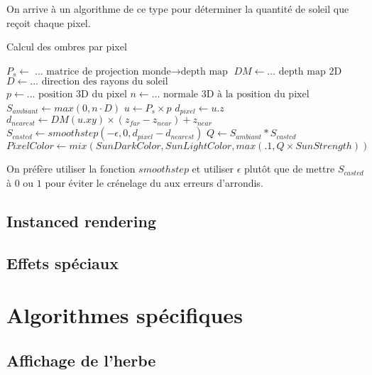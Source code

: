 \documentclass[11pt]{article} %
\begin{document}
On arrive à un algorithme de ce type pour déterminer la quantité de soleil que reçoit chaque pixel.
\begin{algorithm}
\caption{Calcul des ombres par pixel}\label{alg:cap}
\begin{algorithmic}
\State $P_s \gets \text{... matrice de projection monde$\rightarrow$depth map}$
\State $DM \gets \text{... depth map 2D}$
\State $D \gets \text{... direction des rayons du soleil}$
\\
\State $p \gets \text{...  position 3D du pixel}$
\State $n \gets \text{... normale 3D à la position du pixel}$
\\
\State $S_{ambiant} \gets max(0, n\cdot D)$
\State $u \gets P_s\times p$
\State $d_{pixel} \gets u.z$
\State $d_{nearest} \gets DM(u.xy)\times(z_{far}-z_{near})+z_{near}$
\State $S_{casted} \gets smoothstep(-\epsilon, 0, d_{pixel}-d_{nearest})$
\State $Q \gets S_{ambiant}*S_{casted}$
\\
\State $PixelColor\gets mix(SunDarkColor, SunLightColor, max(.1, Q\times SunStrength))$
\end{algorithmic}
\end{algorithm}

On préfère utiliser la fonction $smoothstep$ et utiliser $\epsilon$ plutôt que de mettre $S_{casted}$ à $0$ ou $1$ pour éviter le crénelage du aux erreurs d'arrondis.


\subsection{Instanced rendering}

\subsection{Effets spéciaux}

\subsubsection{} %




\section{Algorithmes spécifiques}


\subsection{Affichage de l'herbe}
\end{document}
